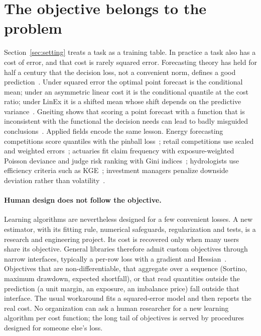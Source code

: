 \section{The objective belongs to the problem}
\label{sec:objectives}

Section~\ref{sec:setting} treats a task as a training table. In practice a
task also has a cost of error, and that cost is rarely squared error.
Forecasting theory has held for half a century that the decision loss, not a
convenient norm, defines a good prediction~\citep{granger1969,elliott2008}.
Under squared error the optimal point forecast is the conditional mean; under
an asymmetric linear cost it is the conditional quantile at the cost ratio;
under LinEx it is a shifted mean whose shift depends on the predictive
variance~\citep{varian1975,christoffersen1997}. Gneiting shows that scoring a
point forecast with a function that is inconsistent with the functional the
decision needs can lead to badly misguided conclusions~\citep{gneiting2011}.
Applied fields encode the same lesson. Energy forecasting competitions score
quantiles with the pinball loss~\citep{hong2016gefcom}; retail competitions use
scaled and weighted errors~\citep{makridakis2022m5}; actuaries fit claim
frequency with exposure-weighted Poisson deviance and judge risk ranking with
Gini indices~\citep{frees2011gini}; hydrologists use efficiency criteria such
as KGE~\citep{gupta2009kge}; investment managers penalize downside deviation
rather than volatility~\citep{sortino1994}.

\paragraph{Human design does not follow the objective.}
Learning algorithms are nevertheless designed for a few convenient losses. A
new estimator, with its fitting rule, numerical safeguards, regularization
and tests, is a research and engineering project. Its cost is recovered only
when many users share its objective. General libraries therefore admit custom
objectives through narrow interfaces, typically a per-row loss with a gradient
and Hessian~\citep{xgboost}. Objectives that are non-differentiable, that
aggregate over a sequence (Sortino, maximum drawdown, expected shortfall), or
that read quantities outside the prediction (a unit margin, an exposure, an
imbalance price) fall outside that interface. The usual workaround fits a
squared-error model and then reports the real cost. No organization can ask a
human researcher for a new learning algorithm per cost function; the long tail
of objectives is served by procedures designed for someone else's loss.

